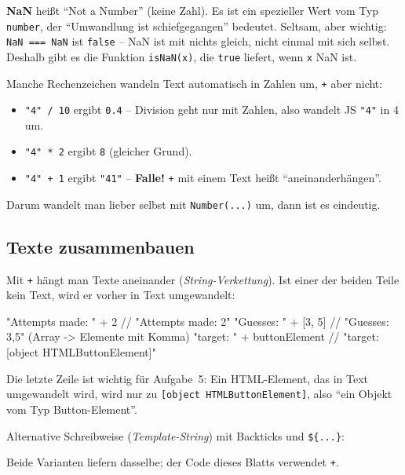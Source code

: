 \documentclass[a4paper,11pt]{article}
\begin{document}
\textbf{NaN} heißt "`Not a Number"' (keine Zahl). Es ist ein spezieller Wert vom Typ \texttt{number}, der
"`Umwandlung ist schiefgegangen"' bedeutet. Seltsam, aber wichtig: \lstinline|NaN === NaN| ist \lstinline|false|
-- NaN ist mit nichts gleich, nicht einmal mit sich selbst. Deshalb gibt es die Funktion \lstinline|isNaN(x)|, die
\lstinline|true| liefert, wenn \texttt{x} NaN ist.

\begin{merkbox}[title={Merke -- automatische Umwandlung}]
Manche Rechenzeichen wandeln Text automatisch in Zahlen um, \texttt{+} aber nicht:
\begin{itemize}[nosep]
\item \lstinline|"4" / 10| ergibt \lstinline|0.4| -- Division geht nur mit Zahlen, also wandelt JS \lstinline|"4"| in 4 um.
\item \lstinline|"4" * 2| ergibt \lstinline|8| (gleicher Grund).
\item \lstinline|"4" + 1| ergibt \lstinline|"41"| -- \textbf{Falle!} \texttt{+} mit einem Text heißt "`aneinanderhängen"'.
\end{itemize}
Darum wandelt man lieber selbst mit \lstinline|Number(...)| um, dann ist es eindeutig.
\end{merkbox}

\subsection{Texte zusammenbauen}

Mit \texttt{+} hängt man Texte aneinander (\emph{String-Verkettung}). Ist einer der beiden Teile kein Text, wird
er vorher in Text umgewandelt:
\begin{code}[numbers=none]
"Attempts made: " + 2        // "Attempts made: 2"
"Guesses: " + [3, 5]         // "Guesses: 3,5"   (Array -> Elemente mit Komma)
"target: " + buttonElement   // "target: [object HTMLButtonElement]"
\end{code}
Die letzte Zeile ist wichtig für Aufgabe~5: Ein HTML-Element, das in Text umgewandelt wird, wird nur zu
\lstinline|[object HTMLButtonElement]|, also "`ein Objekt vom Typ Button-Element"'.

Alternative Schreibweise (\emph{Template-String}) mit Backticks und \lstinline|${...}|:
Beide Varianten liefern dasselbe; der Code dieses Blatts verwendet \texttt{+}.
\end{document}
